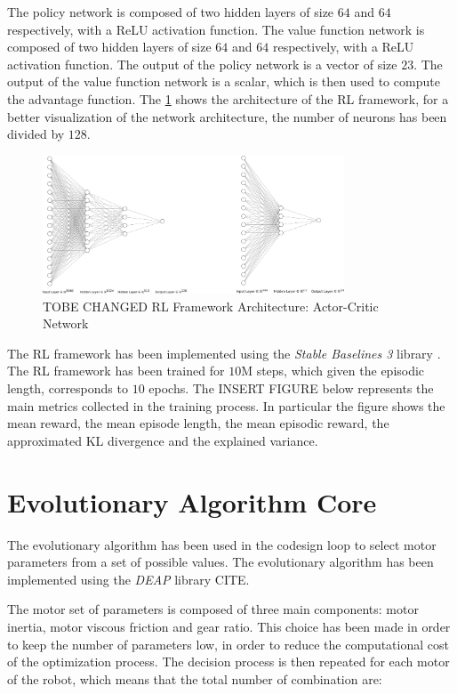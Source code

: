 The policy network is composed of two hidden layers of size $64$ and $64$ respectively, with a \ac{ReLU} activation function. The value function network is composed of two hidden layers of size $64$ and $64$ respectively, with a \ac{ReLU} activation function. The output of the policy network is a vector of size $23$. The output of the value function network is a scalar, which is then used to compute the advantage function. The \cref{fig:rlarchitecture} shows the architecture of the \ac{RL} framework, for a better visualization of the network architecture, the number of neurons has been divided by $128$.

\begin{figure}[h]
    \centering
    \includegraphics[width=0.8\textwidth]{Images/rl_architecture.png}
    \caption{TOBE CHANGED RL Framework Architecture: Actor-Critic Network}
    \label{fig:rlarchitecture}
\end{figure}

The \ac{RL} framework has been implemented using the \textit{Stable Baselines 3} library \cite{raffin_stable-baselines3_2021}. The \ac{RL} framework has been trained for $10$M steps, which given the episodic length, corresponds to $10$ epochs. The INSERT FIGURE below represents the main metrics collected in the training process. In particular the figure shows the mean reward, the mean episode length, the mean episodic reward, the approximated KL divergence and the explained variance.


\section{Evolutionary Algorithm Core}
\label{sec:EvolutionAlgo}


The evolutionary algorithm has been used in the codesign loop to select motor parameters from a set of possible values. The evolutionary algorithm has been implemented using the \textit{DEAP} library CITE.

The motor set of parameters is composed of three main components: motor inertia, motor viscous friction and gear ratio. This choice has been made in order to keep the number of parameters low, in order to reduce the computational cost of the optimization process. The decision process is then repeated for each motor of the robot, which means that the total number of combination are:


